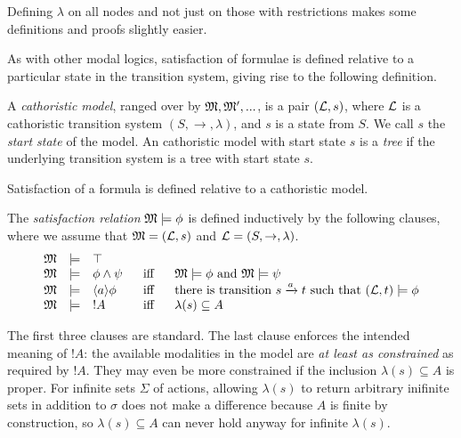 \NI Defining $\lambda$ on all nodes and not just on those with
restrictions makes some definitions and proofs slightly easier.

As with other modal logics, satisfaction of formulae is defined
relative to a particular state in the transition system, giving
rise to the following definition.

\begin{definition}
A \emph{cathoristic model}, ranged over by $\frak{M}, \frak{M}', ...$, is a
pair $(\mathcal{L}, s)$, where $\mathcal{L}$ is a cathoristic transition system
$(S, \rightarrow, \lambda)$, and $s$ is a state from $S$. We call $s$
the \emph{start state} of the model.  An cathoristic model with start
state $s$ is a \emph{tree} if the underlying transition system is a
tree with start state $s$.
\end{definition}

\NI Satisfaction of a formula is defined relative to a cathoristic model.

\begin{definition}\label{ELsatisfaction}
The \emph{satisfaction relation} $\frak{M} \models \phi$ is defined
inductively by the following clauses, where we assume that $\frak{M} =
(\mathcal{L}, s)$ and $\mathcal{L} = (S, \rightarrow, \lambda)$.
\[
\begin{array}{lclcl}
  \frak{M} & \models & \top   \\
  \frak{M} & \models & \phi \land \psi &\ \mbox{ iff } \ & \frak{M}  \models \phi \mbox { and } \frak{M} \models \psi  \\
  \frak{M} & \models & \langle a \rangle \phi & \mbox{ iff } & \text{there is transition } s \xrightarrow{a} t \mbox { such that } (\mathcal{L}, t) \models \phi  \\
  \frak{M} & \models & ! A &\mbox{ iff } & \lambda(s) \subseteq A
\end{array}
\]
\end{definition}

\NI The first three clauses are standard. The last clause enforces the
intended meaning of $!A$: the available modalities in the model are
\emph{at least as constrained} as required by $!A$. They may even be
more constrained if the inclusion $\lambda(s) \subseteq A$ is
proper. For infinite sets $\Sigma$ of actions, allowing $\lambda(s)$
to return arbitrary inifinite sets in addition to $\sigma$ does not
make a difference because $A$ is finite by construction, so
$\lambda(s) \subseteq A$ can never hold anyway for infinite
$\lambda(s)$.



